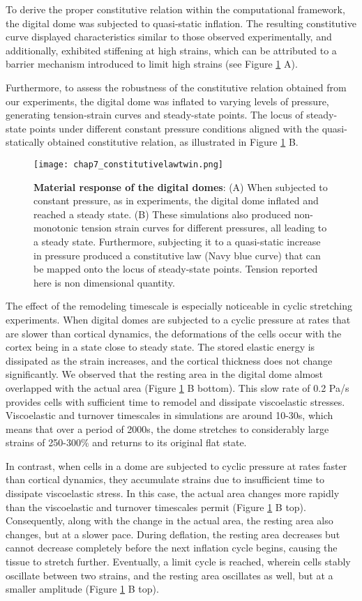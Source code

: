 To derive the proper constitutive relation within the computational framework, the digital dome was subjected to quasi-static inflation. The resulting constitutive curve displayed characteristics similar to those observed experimentally, and additionally, exhibited stiffening at high strains, which can be attributed to a barrier mechanism introduced to limit high strains (see Figure \ref{fig_7_7} A).

Furthermore, to assess the robustness of the constitutive relation obtained from our experiments, the digital dome was inflated to varying levels of pressure, generating tension-strain curves and steady-state points. The locus of steady-state points under different constant pressure conditions aligned with the quasi-statically obtained constitutive relation, as illustrated in Figure  \ref{fig_7_7} B.


\begin{figure}[t]
	\centering
	\texttt{[image: chap7\_constitutivelawtwin.png]}
	\caption{\label{fig_7_7} \textbf{Material response of the digital domes}: (A) When subjected to constant pressure, as in experiments, the digital dome inflated and reached a steady state. (B) These simulations also produced non-monotonic tension strain curves for different pressures, all leading to a steady state. Furthermore, subjecting it to a quasi-static increase in pressure produced a constitutive law (Navy blue curve) that can be mapped onto the locus of steady-state points. Tension reported here is non dimensional quantity.}
\end{figure}

The effect of the remodeling timescale is especially noticeable in cyclic stretching experiments. When digital domes are subjected to a cyclic pressure at rates that are slower than cortical dynamics, the deformations of the cells occur with the cortex being in a state close to steady state. The stored elastic energy is dissipated as the strain increases, and the cortical thickness does not change significantly. We observed that the resting area in the digital dome almost overlapped with the actual area (Figure \ref{fig_7_7} B bottom). This slow rate of 0.2 Pa/s provides cells with sufficient time to remodel and dissipate viscoelastic stresses. Viscoelastic and turnover timescales in simulations are around 10-30s, which means that over a period of 2000s, the dome stretches to considerably large strains of 250-300\% and returns to its original flat state.

In contrast, when cells in a dome are subjected to cyclic pressure at rates faster than cortical dynamics, they accumulate strains due to insufficient time to dissipate viscoelastic stress. In this case, the actual area changes more rapidly than the viscoelastic and turnover timescales permit (Figure \ref{fig_7_7} B top). Consequently, along with the change in the actual area, the resting area also changes, but at a slower pace. During deflation, the resting area decreases but cannot decrease completely before the next inflation cycle begins, causing the tissue to stretch further. Eventually, a limit cycle is reached, wherein cells stably oscillate between two strains, and the resting area oscillates as well, but at a smaller amplitude (Figure \ref{fig_7_7} B top).


